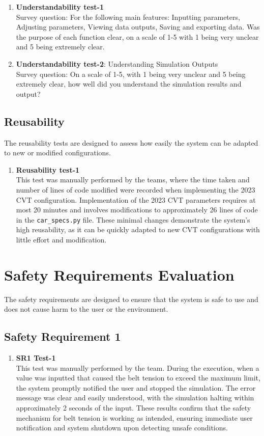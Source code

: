 \documentclass[12pt, titlepage]{article}
\begin{document}
\begin{enumerate}
  \item{\textbf{Understandability test-1}}\\
  Survey question: For the following main features: Inputting parameters, Adjusting parameters, Viewing data outputs, Saving and exporting data. 
  Was the purpose of each function clear, on a scale of 1-5 with 1 being very unclear and 5 being extremely clear. 
  \item{\textbf{Understandability test-2}: Understanding Simulation Outputs}\\
  Survey question: On a scale of 1-5, with 1 being very unclear and 5 being extremely clear, how well did you understand the simulation results and output?
\end{enumerate}

\subsection{Reusability}

The reusability tests are designed to assess how easily the system can be adapted to new or modified configurations. 
\begin{enumerate}
    \item {\textbf{Reusability test-1}}\\
    This test was manually performed by the teams, where the time taken and number of lines of code modified were recorded when implementing the 2023 CVT configuration. 
    Implementation of the 2023 CVT parameters requires at most 20 minutes and involves modifications to approximately 26 lines of code in the \texttt{car\_specs.py} file. 
    These minimal changes demonstrate the system's high reusability, as it can be quickly adapted to new CVT configurations with little effort and modification.
\end{enumerate}
	
\section{Safety Requirements Evaluation}
The safety requirements are designed to ensure that the system is safe to use and does not cause harm to the user or the environment.

\subsection{Safety Requirement 1}
\begin{enumerate}
  \item {\textbf{SR1 Test-1}}\\
  This test was manually performed by the team. During the execution, when a value was inputted that caused the belt tension to exceed the maximum limit, the system promptly notified the user and stopped the simulation. The error message was clear and easily understood, with the simulation halting within approximately 2 seconds of the input. These results confirm that the safety mechanism for belt tension is working as intended, ensuring immediate user notification and system shutdown upon detecting unsafe conditions.
  \end{enumerate}
\end{document}
